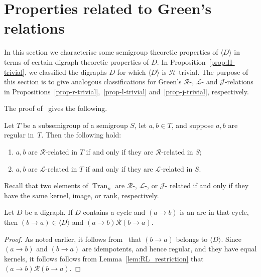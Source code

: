 \documentclass[ALCO,ThmDefs,Unicode,epreuves]{cedram}
\DeclareMathOperator{\Tran}{Tran}
\newcommand{\genset}[1]{\langle#1\rangle}
\newcommand{\LL}{\mathcal{L}}
\newcommand{\R}{\mathcal{R}}
\newcommand{\J}{\mathcal{J}}
\newcommand{\Hcal}{\mathcal{H}}
\begin{document}
\section{Properties related to Green's relations} \label{sec:Green}

In this section we characterise some semigroup theoretic properties of
$\genset{D}$ in terms of certain digraph theoretic properties of $D$. In
Proposition~\ref{prop:H-trivial}, we classified the digraphs $D$ for which
$\genset{D}$ is $\Hcal$-trivial. The purpose of this section is to give analogous
classifications for Green's $\R$-, $\LL$- and $\J$-relations in
Propositions~\ref{prop-r-trivial},~\ref{prop-l-trivial}
and~\ref{prop-j-trivial}, respectively.

The proof of~\cite[Proposition~2.4.2]{Howie1995aa} gives the following.

\begin{lemma}\label{lem:RL_restriction}
 Let $T$ be a subsemigroup of a semigroup $S$, let $a,b\in T$, and suppose
 $a,b$ are regular in~$T$. Then the following hold:
 \begin{enumerate}[(\roman*)]
 \item\label{lemma4.1_i} 
 $a, b$ are $\R$-related in $T$ if and only if they are $\R$-related
 in $S$;
 \item\label{lemma4.1_ii} 
 $a, b$ are $\LL$-related in $T$ if and only if they are $\LL$-related
 in $S$.
 \end{enumerate}
\end{lemma}

Recall that two elements of $\Tran_n$ are $\R$-, $\LL$-, or $\J$- related if
and only if they have the same kernel, image, or rank, respectively.
\begin{lemma} \label{lem-r-related-idempotents}
 Let $D$ be a digraph. If $D$ contains a cycle and $(a
 \to b)$ is an arc in that cycle, then $(b\to a) \in \genset{D}$ and
 $(a\to b)\R(b \to a)$.
\end{lemma}
\begin{proof}
 As noted earlier, it follows from~\cite[Lemma~2.3]{Yang2005aa} that $(b \to a)$
 belongs to $\genset{D}$. Since $(a\to b)$ and $(b \to a)$ are idempotents, and
 hence regular, and they have equal kernels, it follows follows from
 Lemma~\ref{lem:RL_restriction} that $(a\to b)\R (b \to a)$.
\end{proof}
\end{document}
